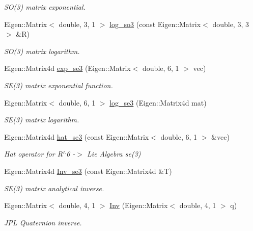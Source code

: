 \begin{DoxyCompactItemize}
\begin{DoxyCompactList}\small\item\em S\+O(3) matrix exponential. \end{DoxyCompactList}\item 
Eigen\+::\+Matrix$<$ double, 3, 1 $>$ \hyperlink{namespaceov__core_a1bbbcb3ed59aa7dff7883c2e8644d9fb}{log\+\_\+so3} (const Eigen\+::\+Matrix$<$ double, 3, 3 $>$ \&R)
\begin{DoxyCompactList}\small\item\em S\+O(3) matrix logarithm. \end{DoxyCompactList}\item 
Eigen\+::\+Matrix4d \hyperlink{namespaceov__core_a8907fdb4273f23741299fb23a1c1f572}{exp\+\_\+se3} (Eigen\+::\+Matrix$<$ double, 6, 1 $>$ vec)
\begin{DoxyCompactList}\small\item\em S\+E(3) matrix exponential function. \end{DoxyCompactList}\item 
Eigen\+::\+Matrix$<$ double, 6, 1 $>$ \hyperlink{namespaceov__core_aaf3626f4ed6392b8b0b0d0a75ff08a61}{log\+\_\+se3} (Eigen\+::\+Matrix4d mat)
\begin{DoxyCompactList}\small\item\em S\+E(3) matrix logarithm. \end{DoxyCompactList}\item 
Eigen\+::\+Matrix4d \hyperlink{namespaceov__core_a2854f4368bab599be2404f396f5ee434}{hat\+\_\+se3} (const Eigen\+::\+Matrix$<$ double, 6, 1 $>$ \&vec)
\begin{DoxyCompactList}\small\item\em Hat operator for R$^\wedge$6 -\/$>$ Lie Algebra se(3) \end{DoxyCompactList}\item 
Eigen\+::\+Matrix4d \hyperlink{namespaceov__core_aba0a3888c4f1998478719dc70597ac73}{Inv\+\_\+se3} (const Eigen\+::\+Matrix4d \&T)
\begin{DoxyCompactList}\small\item\em S\+E(3) matrix analytical inverse. \end{DoxyCompactList}\item 
Eigen\+::\+Matrix$<$ double, 4, 1 $>$ \hyperlink{namespaceov__core_a3ebbc28aa8b0945da800771168f7c843}{Inv} (Eigen\+::\+Matrix$<$ double, 4, 1 $>$ q)
\begin{DoxyCompactList}\small\item\em J\+PL Quaternion inverse. \end{DoxyCompactList}\item 

\end{DoxyCompactItemize}

